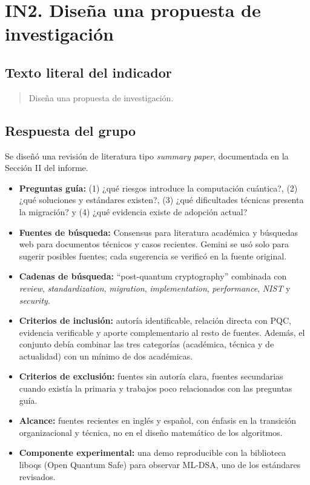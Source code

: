 \section*{IN2. Diseña una propuesta de investigación}

\subsection*{Texto literal del indicador}
\begin{quote}
Diseña una propuesta de investigación.
\end{quote}

\subsection*{Respuesta del grupo}
Se diseñó una revisión de literatura tipo \textit{summary paper}, documentada en la Sección II del informe.

\begin{itemize}[leftmargin=*]
  \item \textbf{Preguntas guía:} (1) ¿qué riesgos introduce la computación cuántica?, (2) ¿qué soluciones y estándares existen?, (3) ¿qué dificultades técnicas presenta la migración? y (4) ¿qué evidencia existe de adopción actual?
  \item \textbf{Fuentes de búsqueda:} Consensus para literatura académica y búsquedas web para documentos técnicos y casos recientes. Gemini se usó solo para sugerir posibles fuentes; cada sugerencia se verificó en la fuente original.
  \item \textbf{Cadenas de búsqueda:} ``post-quantum cryptography'' combinada con \textit{review}, \textit{standardization}, \textit{migration}, \textit{implementation}, \textit{performance}, \textit{NIST} y \textit{security}.
  \item \textbf{Criterios de inclusión:} autoría identificable, relación directa con PQC, evidencia verificable y aporte complementario al resto de fuentes. Además, el conjunto debía combinar las tres categorías (académica, técnica y de actualidad) con un mínimo de dos académicas.
  \item \textbf{Criterios de exclusión:} fuentes sin autoría clara, fuentes secundarias cuando existía la primaria y trabajos poco relacionados con las preguntas guía.
  \item \textbf{Alcance:} fuentes recientes en inglés y español, con énfasis en la transición organizacional y técnica, no en el diseño matemático de los algoritmos.
  \item \textbf{Componente experimental:} una demo reproducible con la biblioteca liboqs (Open Quantum Safe) para observar ML-DSA, uno de los estándares revisados.
\end{itemize}
